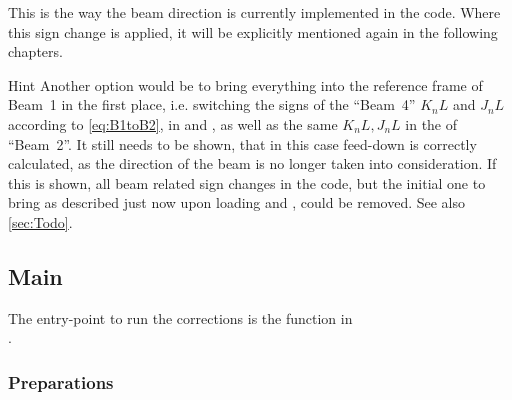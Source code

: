 This is the way the beam direction is currently implemented in the code.
Where this sign change is applied, it will be explicitly mentioned again in the following chapters.

\begin{important}
        \item[\raisedtaget{Hint:SwitchBeamSigns}\color{AtlasGreen} Hint]
        Another option would be to bring everything into the reference frame of Beam~1 in the first place, 
        i.e. switching the signs of the ``Beam~4'' $K_nL$ and $J_nL$ according to \cref{eq:B1toB2}, 
        in  and , as well as the same $K_nL, J_nL$ in the  of ``Beam~2''.
        It still needs to be shown, that in this case feed-down is correctly calculated, 
        as the direction of the beam is no longer taken into consideration.
        If this is shown, all beam related sign changes in the code, but the initial one to bring 
        as described just now upon loading  and , could be removed.
        See also \cref{sec:Todo}.
\end{important}

\subsection{Main}
The entry-point to run the corrections is the  function in \\
.


\subsubsection{Preparations}
\label{sec:Preparations}

